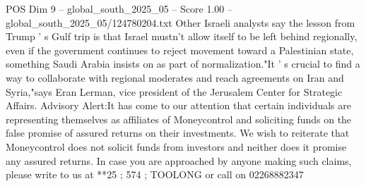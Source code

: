 \begin{textsample}{POS Dim 9 – global\_south\_2025\_05 – Score 1.00 – global\_south\_2025\_05/124780204.txt}
Other Israeli analysts say the lesson from Trump ' s Gulf trip is that Israel mustn't allow itself to be left behind regionally, even if the government continues to reject movement toward a Palestinian state, something Saudi Arabia insists on as part of normalization."It ' s crucial to find a way to collaborate with regional moderates and reach agreements on Iran and Syria,"says Eran Lerman, vice president of the Jerusalem Center for Strategic Affairs.
Advisory Alert:It has come to our attention that certain individuals are representing themselves as affiliates of Moneycontrol and soliciting funds on the false promise of assured returns on their investments.
We wish to reiterate that Moneycontrol does not solicit funds from investors and neither does it promise any assured returns.
In case you are approached by anyone making such claims, please write to us at **25 ; 574 ; TOOLONG or call on 02268882347

\end{textsample}
